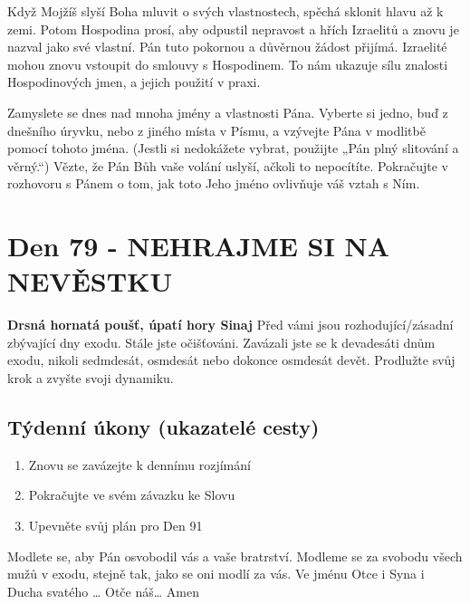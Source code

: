 \documentclass[11pt]{article}
\newcommand{\zacatekDvanactyTyden}{
\textbf{Drsná hornatá poušť, úpatí hory Sinaj} \newline 
Před vámi jsou rozhodující/zásadní zbývající dny exodu. Stále jste očišťováni. Zavázali jste se k devadesáti dnům exodu, nikoli sedmdesát, osmdesát nebo dokonce osmdesát devět. Prodlužte svůj krok a zvyšte svoji dynamiku.

\subsection*{Týdenní úkony (ukazatelé cesty)}
\begin{enumerate}
  \item Znovu se zavázejte k dennímu rozjímání
  \item Pokračujte ve svém závazku ke Slovu
  \item Upevněte svůj plán pro Den 91
\end{enumerate}
Modlete se, aby Pán osvobodil vás a vaše bratrství. \newline
Modleme se za svobodu všech mužů v exodu, stejně tak, jako se oni modlí za vás.\newline
Ve jménu Otce i Syna i Ducha svatého …  Otče náš… Amen
}
\begin{document}
Když Mojžíš slyší Boha mluvit o svých vlastnostech, spěchá sklonit hlavu až k zemi. Potom Hospodina prosí, aby
odpustil nepravost a hřích Izraelitů a znovu je nazval jako své vlastní. Pán tuto pokornou a důvěrnou žádost přijímá.
Izraelité mohou znovu vstoupit do smlouvy s Hospodinem. To nám ukazuje sílu znalosti Hospodinových jmen, a jejich
použití v praxi.

Zamyslete se dnes nad mnoha jmény a vlastnosti Pána. Vyberte si jedno, buď z dnešního úryvku, nebo z jiného místa
v Písmu, a vzývejte Pána v modlitbě pomocí tohoto jména. (Jestli si nedokážete vybrat, použijte „Pán plný slitování a
věrný.“) Vězte, že Pán Bůh vaše volání uslyší, ačkoli to nepocítíte. Pokračujte v rozhovoru s Pánem o tom, jak toto
Jeho jméno ovlivňuje váš vztah s Ním.


\newpage
\section{Den 79 - NEHRAJME SI NA NEVĚSTKU}
\zacatekDvanactyTyden
\end{document}
